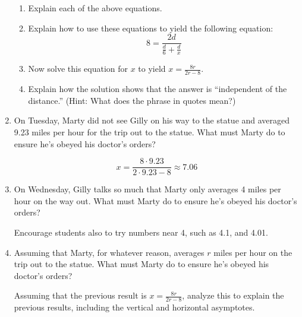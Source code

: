 \begin{prob}
\begin{enumerate}
\begin{teachingnote}

\begin{enumerate}[1.]
\item Explain each of the above equations.  
\item Explain how to use these equations to yield the following equation:  
$$8 = \frac{2d}{\frac{d}{6}+\frac{d}{x}}$$
\item Now solve this equation for $x$ to yield $x=\frac{8r}{2r-8}$.  
\item Explain how the solution shows that the answer is ``independent of the distance.''  (Hint:  What does the phrase in quotes mean?)  
\end{enumerate}

\end{teachingnote}

\item On Tuesday, Marty did not see Gilly on his way to the statue and
averaged 9.23 miles per hour for the trip out to the statue.
What must Marty do to ensure he's obeyed his doctor's orders?
\begin{teachingnote}
$$x=\frac{8\cdot 9.23}{2\cdot 9.23 - 8}\approx 7.06$$
\end{teachingnote}
\item On Wednesday, Gilly talks so much
that Marty only averages 4 miles per hour on the way out.  What must
Marty do to ensure he's obeyed his doctor's orders?
\begin{teachingnote}
Encourage students also to try numbers near 4, such as 4.1, and 4.01.
\end{teachingnote}

\item Assuming that Marty, for whatever reason, averages $r$ miles per hour on
the trip out to the statue. What must Marty do to ensure he's obeyed
his doctor's orders?

\begin{teachingnote}
Assuming that the previous result is $x=\frac{8r}{2r-8}$, analyze this to explain the previous results, including the vertical and horizontal asymptotes.
\end{teachingnote}
\end{enumerate}
\end{prob}


%

